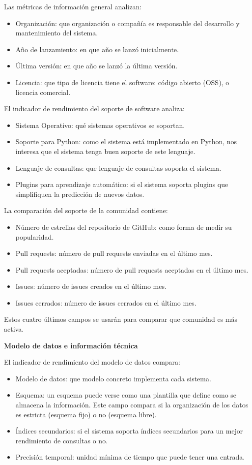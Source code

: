 Las métricas de información general analizan:
\begin{itemize}
    \item Organización: que organización o compañía es responsable del desarrollo y mantenimiento del sistema.
    \item Año de lanzamiento: en que año se lanzó inicialmente.
    \item Última versión: en que año se lanzó la última versión.
    \item Licencia: que tipo de licencia tiene el software: código abierto (OSS), o licencia comercial.
\end{itemize}
El indicador de rendimiento del soporte de software analiza:
\begin{itemize}
    \item Sistema Operativo: qué sistemas operativos se soportan.
    \item Soporte para Python: como el sistema está implementado en Python, nos interesa que el sistema tenga
        buen soporte de este lenguaje.
    \item Lenguaje de consultas: que lenguaje de consultas soporta el sistema.
    \item Plugins para aprendizaje automático: si el sistema soporta plugins que simplifiquen la predicción de nuevos
        datos.
\end{itemize}
La comparación del soporte de la comunidad contiene:
\begin{itemize}
    \item Número de estrellas del repositorio de GitHub: como forma de medir su popularidad.
    \item Pull requests: número de pull requests enviadas en el último mes.
    \item Pull requests aceptadas: número de pull requests aceptadas en el último mes.
    \item Issues: número de issues creados en el último mes.
    \item Issues cerrados: número de issues cerrados en el último mes.
\end{itemize}
Estos cuatro últimos campos se usarán para comparar que comunidad es más activa.

\textbf{Modelo de datos e información técnica}

El indicador de rendimiento del modelo de datos compara:
\begin{itemize}
    \item Modelo de datos: que modelo concreto implementa cada sistema.
    \item Esquema: un esquema puede verse como una plantilla que define como se almacena la información. Este campo
        compara si la organización de los datos es estricta (esquema fijo) o no (esquema libre).
    \item Índices secundarios: si el sistema soporta índices secundarios para un mejor rendimiento de consultas o no.
    \item Precisión temporal: unidad mínima de tiempo que puede tener una entrada.
\end{itemize}


